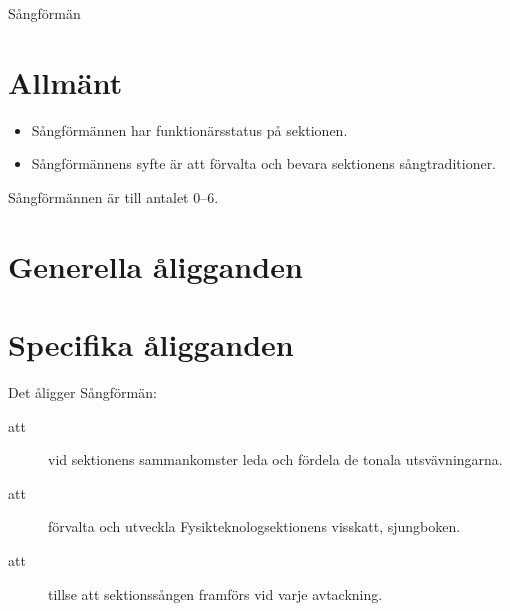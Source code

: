 \documentclass[a4paper]{article}
\begin{document}
\renewcommand{\forening}{Sångförmän} %

\begin{foreningenv}{\forening{}} %
    \section{Allmänt}
    \begin{itemize}
        \item Sångförmännen har funktionärsstatus på sektionen.
        \item Sångförmännens syfte är att förvalta och bevara sektionens sångtraditioner.
    \end{itemize}
    Sångförmännen är till antalet 0--6.
    
    \section{Generella åligganden}
    \aliggsektfunkt{}
    
    \section{Specifika åligganden}
    Det åligger \forening{}:
    \begin{description}
        \item[att] vid sektionens sammankomster leda och fördela de tonala utsvävningarna.
        \item[att] förvalta och utveckla Fysikteknologsektionens visskatt, sjungboken.
        \item[att] tillse att sektionssången framförs vid varje avtackning. %
    \end{description}
\end{foreningenv}
\end{document}
